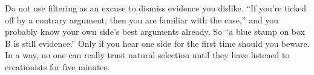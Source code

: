 Do not use filtering as an excuse to dismiss evidence you dislike. ``If you're ticked off by a contrary argument, then you are familiar with the case,'' and you probably know your own side's best arguments already. So ``a blue stamp on box B is still evidence.''  Only if you hear one side for the first time should you beware. In a way, no one can really trust natural selection until they have listened to creationists for five minutes.
